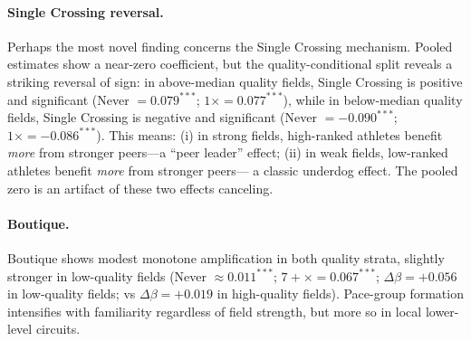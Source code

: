 \documentclass[12pt]{article}
\theoremstyle{definition}
\theoremstyle{remark}
\begin{document}
\paragraph{Single Crossing reversal.}
Perhaps the most novel finding concerns the Single Crossing mechanism.
Pooled estimates show a near-zero coefficient, but the quality-conditional
split reveals a striking reversal of sign:
in above-median quality fields, Single Crossing is positive and significant
(Never $= 0.079^{***}$; $1\times = 0.077^{***}$),
while in below-median quality fields, Single Crossing is negative and significant
(Never $= -0.090^{***}$; $1\times = -0.086^{***}$).
This means:
(i) in strong fields, high-ranked athletes benefit \textit{more} from
stronger peers---a ``peer leader'' effect;
(ii) in weak fields, low-ranked athletes benefit \textit{more} from stronger peers---
a classic underdog effect.
The pooled zero is an artifact of these two effects canceling.

\paragraph{Boutique.}
Boutique shows modest monotone amplification in both quality strata,
slightly stronger in low-quality fields (Never $\approx 0.011^{***}$;
$7+\times = 0.067^{***}$; $\Delta\beta = +0.056$ in low-quality fields;
vs $\Delta\beta = +0.019$ in high-quality fields).
Pace-group formation intensifies with familiarity regardless of field strength,
but more so in local lower-level circuits.
\end{document}

